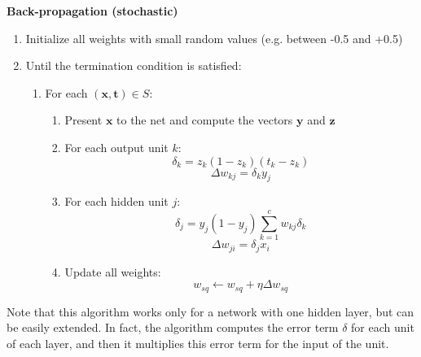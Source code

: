 \textbf{Back-propagation (stochastic)}
\begin{enumerate}
    \item Initialize all weights with small random values (e.g. between -0.5 and +0.5)
    \item Until the termination condition is satisfied:
    \begin{enumerate}
        \item For each $(\textbf{x},\textbf{t}) \in S$:
        \begin{enumerate}
            \item Present $\textbf{x}$ to the net and compute the vectors $\textbf{y}$ and $\textbf{z}$
            \item For each output unit $k$:
            \[\delta_{k} = z_{k}(1 - z_{k})(t_{k} - z_{k})\]
            \[\Delta w_{kj} = \delta_{k}y_{j}\]

            \item For each hidden unit $j$:
            \[\delta_{j} = y_{j}(1 - y_{j})\sum_{k=1}^{c}w_{kj}\delta_{k}\]
            \[\Delta w_{ji} = \delta_{j}x_{i}\]

            \item Update all weights:
            \[w_{sq} \leftarrow w_{sq} + \eta \Delta w_{sq}\]
        \end{enumerate}
    \end{enumerate}
\end{enumerate}
Note that this algorithm works only for a network with one hidden layer, but can be easily extended. In fact, the algorithm computes the error term $\delta$ for each unit of each layer, and then it multiplies this error term for the input of the unit.

